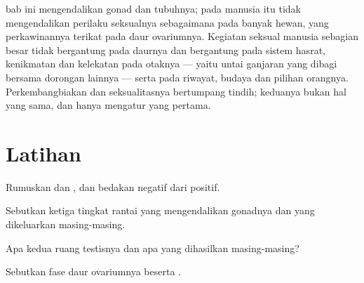 \begin{remark}\label{rem:g11:hormones-and-reproduction:brain}
 bab ini mengendalikan gonad dan tubuhnya; pada manusia 
itu tidak mengendalikan perilaku seksualnya sebagaimana pada banyak
hewan, yang perkawinannya terikat pada daur ovariumnya. Kegiatan
seksual manusia sebagian besar tidak bergantung pada daurnya dan
bergantung pada sistem hasrat, kenikmatan dan kelekatan pada otaknya
--- yaitu untai ganjaran yang dibagi bersama dorongan lainnya --- serta
pada riwayat, budaya dan pilihan orangnya. Perkembangbiakan dan
seksualitasnya bertumpang tindih; keduanya bukan hal yang sama, dan
 hanya mengatur yang pertama.
\end{remark}

\section{Latihan}

\begin{exercise}[$\star$]\label{exo:g11:hormones-and-reproduction:1}
Rumuskan  dan , dan bedakan  negatif dari
 positif.
\end{exercise}

\begin{exercise}[$\star$]\label{exo:g11:hormones-and-reproduction:2}
Sebutkan ketiga tingkat rantai yang mengendalikan gonadnya dan 
yang dikeluarkan masing-masing.
\end{exercise}

\begin{exercise}[$\star$]\label{exo:g11:hormones-and-reproduction:3}
Apa kedua ruang testisnya dan apa yang dihasilkan masing-masing?
\end{exercise}

\begin{exercise}[$\star$]\label{exo:g11:hormones-and-reproduction:4}
Sebutkan fase daur ovariumnya beserta .
\end{exercise}

